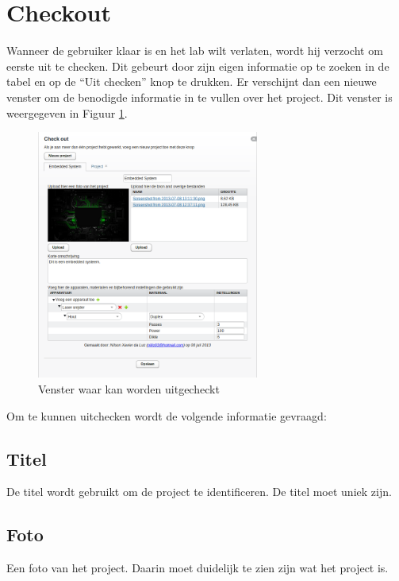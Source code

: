 \section{Checkout}

Wanneer de gebruiker klaar is en het lab wilt verlaten, wordt hij verzocht om eerste uit te checken. Dit gebeurt door zijn eigen informatie op te zoeken in de tabel en op de ``Uit checken'' knop te drukken. Er verschijnt dan een nieuwe venster om de benodigde informatie in te vullen over het project. Dit venster is weergegeven in Figuur \ref{fig:checkout-window}.

\begin{figure}[Hh]
	\centering
	\includegraphics[width=0.65\textwidth]{Images/checkout-window.png}
	\caption{Venster waar kan worden uitgecheckt}
	\label{fig:checkout-window}
\end{figure}

Om te kunnen uitchecken wordt de volgende informatie gevraagd:

\subsection{Titel}

De titel wordt gebruikt om de project te identificeren. De titel moet uniek zijn.

\subsection{Foto}

Een foto van het project. Daarin moet duidelijk te zien zijn wat het project is.

